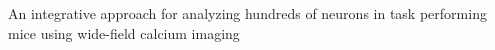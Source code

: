 An integrative approach for analyzing hundreds of neurons in task performing mice using wide-field calcium imaging
